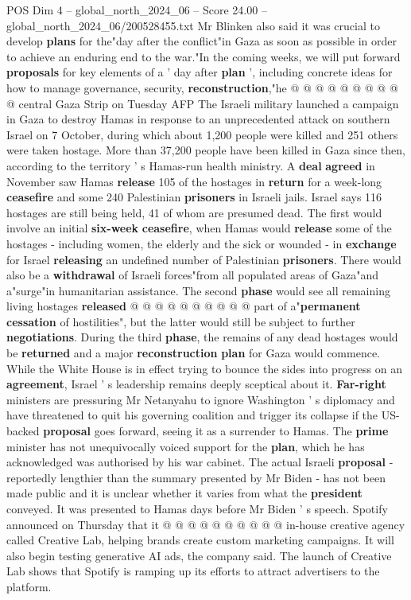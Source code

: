 \begin{textsample}{POS Dim 4 – global\_north\_2024\_06 – Score 24.00 – global\_north\_2024\_06/200528455.txt}
Mr Blinken also said it was crucial to develop \textbf{plans} for the"day after the conflict"in Gaza as soon as possible in order to achieve an enduring end to the war."In the coming weeks, we will put forward \textbf{proposals} for key elements of a ' day after \textbf{plan} ', including concrete ideas for how to manage governance, security, \textbf{reconstruction},"he @ @ @ @ @ @ @ @ @ @ central Gaza Strip on Tuesday AFP The Israeli military launched a campaign in Gaza to destroy Hamas in response to an unprecedented attack on southern Israel on 7 October, during which about 1,200 people were killed and 251 others were taken hostage.
More than 37,200 people have been killed in Gaza since then, according to the territory ' s Hamas-run health ministry.
A \textbf{deal} \textbf{agreed} in November saw Hamas \textbf{release} 105 of the hostages in \textbf{return} for a week-long \textbf{ceasefire} and some 240 Palestinian \textbf{prisoners} in Israeli jails.
Israel says 116 hostages are still being held, 41 of whom are presumed dead.
The first would involve an initial \textbf{six-week} \textbf{ceasefire}, when Hamas would \textbf{release} some of the hostages - including women, the elderly and the sick or wounded - in \textbf{exchange} for Israel \textbf{releasing} an undefined number of Palestinian \textbf{prisoners}.
There would also be a \textbf{withdrawal} of Israeli forces"from all populated areas of Gaza"and a"surge"in humanitarian assistance.
The second \textbf{phase} would see all remaining living hostages \textbf{released} @ @ @ @ @ @ @ @ @ @ part of a"\textbf{permanent} \textbf{cessation} of hostilities", but the latter would still be subject to further \textbf{negotiations}.
During the third \textbf{phase}, the remains of any dead hostages would be \textbf{returned} and a major \textbf{reconstruction} \textbf{plan} for Gaza would commence.
While the White House is in effect trying to bounce the sides into progress on an \textbf{agreement}, Israel ' s leadership remains deeply sceptical about it. \textbf{Far-right} ministers are pressuring Mr Netanyahu to ignore Washington ' s diplomacy and have threatened to quit his governing coalition and trigger its collapse if the US-backed \textbf{proposal} goes forward, seeing it as a surrender to Hamas.
The \textbf{prime} minister has not unequivocally voiced support for the \textbf{plan}, which he has acknowledged was authorised by his war cabinet.
The actual Israeli \textbf{proposal} - reportedly lengthier than the summary presented by Mr Biden - has not been made public and it is unclear whether it varies from what the \textbf{president} conveyed.
It was presented to Hamas days before Mr Biden ' s speech.
Spotify announced on Thursday that it @ @ @ @ @ @ @ @ @ @ in-house creative agency called Creative Lab, helping brands create custom marketing campaigns.
It will also begin testing generative AI ads, the company said.
The launch of Creative Lab shows that Spotify is ramping up its efforts to attract advertisers to the platform.


\end{textsample}
